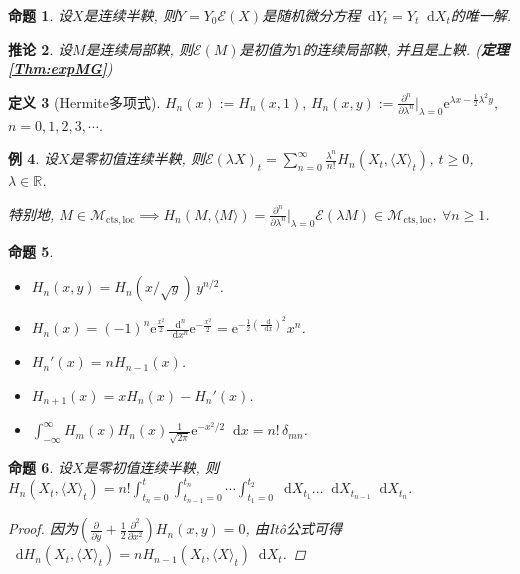 \documentclass{ctexart}
\theoremstyle{definition}
\newtheorem{Def}{定义}[section]
\theoremstyle{remark}
\theoremstyle{plain}
\newtheorem{Prop}[Def]{命题}
\newtheorem{Cor}[Def]{推论}
\newtheorem{Eg}[Def]{例}
\newcommand{\1}{\mathbbm{1}}				%
\newcommand{\agp}[1]{\langle #1 \rangle}	%
\newcommand{\R}{\mathbb{R}}					%
\renewcommand*{\d}{\mathop{}\!\mathrm{d}}	%
\newcommand{\pd}{\partial}					%
\newcommand{\p}[3][]{\frac{\pd^{#1}#2}{\pd{#3}^{#1}}}%
\newcommand{\e}{\mathrm{e}}
\begin{document}
\begin{Prop}
设$X$是连续半鞅, 则$Y = Y_{0}\mathcal{E}(X)$是随机微分方程$\d Y_{t} = Y_{t} \d X_{t}$的唯一解.
\end{Prop}
\begin{Cor}
设$M$是连续局部鞅, 则$\mathcal{E}(M)$是初值为$1$的连续局部鞅, 并且是上鞅. \hfill\normalfont (\PointingHand\textbf{定理\ref{Thm:expMG}})
\end{Cor}

\begin{Def}[Hermite多项式]
$H_{n}(x) := H_{n}(x,1)$, $H_{n}(x,y) := \p[n]{}{\lambda}\big|_{\lambda=0} \e^{\lambda x - \frac{1}{2}\lambda^{2}y}$, $n = 0,1,2,3,\cdots$.
\end{Def}

\begin{Eg}
设$X$是零初值连续半鞅, 则$\mathcal{E}(\lambda X)_{t} = \sum_{n=0}^{\infty} \frac{\lambda^n}{n!} H_{n}(X_{t},\agp{X}_{t})$, $t \ge 0$, $\lambda \in \R$. \par
特别地, $M \in \mathcal{M}_{\mathrm{cts},\mathrm{loc}} \implies H_{n}(M,\agp{M}) = \p[n]{}{\lambda}\big|_{\lambda=0} \mathcal{E}(\lambda M) \in \mathcal{M}_{\mathrm{cts},\mathrm{loc}} ,\ \forall n \ge 1$.
\end{Eg}

\begin{Prop}
\begin{itemize}
	\item $H_{n}(x,y) = H_{n}(x/\sqrt{y}) \, y^{n/2}$.
	\item $H_{n}(x) = (-1)^{n}\e^{\frac{x^{2}}{2}} \frac{\d^n}{\d x^n} \e^{-\frac{x^{2}}{2}} = \e^{-\frac{1}{2}(\frac{\d}{\d x})^{2}} x^{n}$.
	\item $H_{n}'(x) = n H_{n-1}(x)$.
	\item $H_{n+1}(x) = x H_{n}(x) - H_{n}'(x)$.
	\item $\int_{-\infty}^{\infty} H_{m}(x) H_{n}(x) \frac{1}{\sqrt{2\pi}}\e^{-x^{2}/2} \d x = n! \, \delta_{mn}$.
\end{itemize}
\end{Prop}

\begin{Prop}\label{Prop:Hermite_polynomial_differential}
设$X$是零初值连续半鞅, 则$H_{n}(X_{t},\agp{X}_{t}) = n! \int_{t_{n}=0}^{t} \int_{t_{n-1}=0}^{t_{n}} \cdots \int_{t_{1}=0}^{t_{2}} \d X_{t_{1}} \dots \d X_{t_{n-1}} \d X_{t_{n}}$.
\begin{proof}
因为$(\p{}{y}+\frac{1}{2}\p[2]{}{x}) H_{n}(x,y) = 0$, 由It\^{o}公式可得$\d H_{n}(X_{t},\agp{X}_{t}) = n H_{n-1}(X_{t},\agp{X}_{t}) \d X_{t}$.
\end{proof}
\end{Prop}
\end{document}
